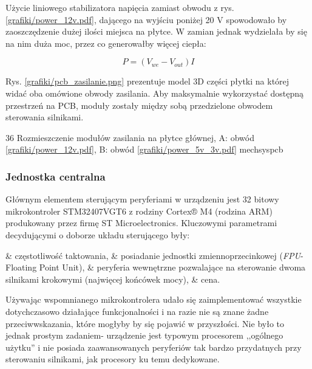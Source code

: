 Użycie liniowego stabilizatora napięcia zamiast obwodu z rys. \ref{grafiki/power_12v.pdf}, dającego na wyjściu poniżej 20 V spowodowało by zaoszczędzenie dużej ilości miejsca na płytce. W zamian jednak wydzielała by się na nim duża moc, przez co generowałby więcej ciepła:

\begin{equation} \label{eq:zasilanie1}
	P = (V_{we} - V_{out})I
\end{equation}

Rys. \ref{grafiki/pcb_zasilanie.png} prezentuje model 3D części płytki na której widać oba omówione obwody zasilania. Aby maksymalnie wykorzystać dostępną przestrzeń na PCB, moduły zostały między sobą przedzielone obwodem sterowania silnikami.

	{36}
	{Rozmieszczenie modułów zasilania na płytce głównej, A: obwód \ref{grafiki/power_12v.pdf}, B: obwód \ref{grafiki/power_5v_3v.pdf}}
	{mechsyspcb}
	
\subsubsection{Jednostka centralna}

Głównym elementem sterującym peryferiami w urządzeniu jest 32 bitowy mikrokontroler STM32407VGT6 z rodziny Cortex® M4 (rodzina ARM) produkowany przez firmę ST Microelectronics. Kluczowymi parametrami decydującymi o doborze układu sterującego były:

\begin{easylist}
	& częstotliwość taktowania,
	& posiadanie jednostki zmiennoprzecinkowej ({\it FPU}- Floating Point Unit),
	& peryferia wewnętrzne pozwalające na sterowanie dwoma silnikami krokowymi (najwięcej końcówek mocy),
	& cena.
	\\
\end{easylist} 

Używając wspomnianego mikrokontrolera udało się zaimplementować wszystkie dotychczasowo działające funkcjonalności i na razie nie są znane żadne przeciwwskazania, które mogłyby by się pojawić w przyszłości. Nie było to jednak prostym zadaniem- urządzenie jest typowym procesorem ,,ogólnego użytku'' i nie posiada zaawansowanych peryferiów tak bardzo przydatnych przy sterowaniu silnikami, jak procesory ku temu dedykowane. 

